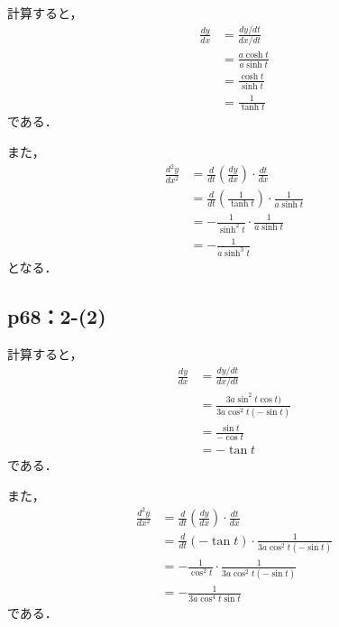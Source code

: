 \documentclass[uplatex,dvipdfmx,a4paper,10pt,fleqn]{jsarticle}
\begin{document}
\begin{tleftbar}
    計算すると，
    \begin{align*} 
        \frac{dy}{dx} & = \frac{ dy / dt}{dx /dt} \\
        & = \frac{a\cosh t}{a \sinh t} \\
        & = \frac{\cosh t}{\sinh t} \\
        & =\frac{1}{\tanh t}
    \end{align*} 
    である．

    また，
    \begin{align*} 
        \frac{d^2 y}{d x^2} & = \frac{d}{dt} \left (\frac{dy}{dx} \right ) \cdot  \frac{dt}{dx} \\
        & = \frac{d}{dt} \left ( \frac{1}{\tanh t} \right)\cdot \frac{1}{a\sinh t} \\
        & = -\frac{1}{\sinh^2 t} \cdot \frac{1}{a \sinh t} \\
        & = -\frac{1}{a\sinh ^3t}
    \end{align*} 
    となる．
\end{tleftbar}

\subsection*{p68：2-(2)}

\begin{tleftbar}
    計算すると，
    \begin{align*} 
        \frac{dy}{dx} & = \frac{ dy / dt}{dx /dt} \\
        & = \frac{ 3a \sin ^2 t \cos t)}{3a \cos ^2 t (-\sin t)} \\
        & =\frac{\sin t}{-\cos  t} \\
        & =-\tan t
    \end{align*} 
    である．

    また，
    \begin{align*} 
        \frac{d^2 y}{d x^2} & = \frac{d}{dt} \left (\frac{dy}{dx} \right ) \cdot  \frac{dt}{dx} \\
        & = \frac{d}{dt} ( -\tan t)\cdot \frac{1}{3a \cos ^2 t (-\sin t)} \\
        & = -\frac{1}{\cos ^2 t }\cdot \frac{1}{3a \cos ^2 t (-\sin t)} \\
        & = -\frac{1}{3a \cos ^4 t \sin t}
    \end{align*} 
    である．
\end{tleftbar}
\end{document}
